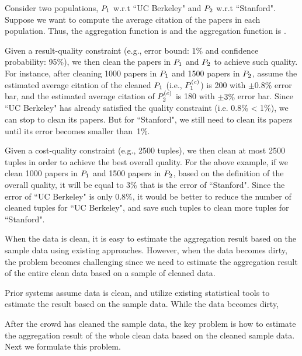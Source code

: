 \begin{example}\label{exa:problem-formulation}
Consider two populations, $P_{1}$ w.r.t ``UC Berkeley" and  $P_{2}$ w.r.t ``Stanford". Suppose we want to compute the average citation of the papers in each population. Thus, the aggregation function is  and the aggregation function is . 

Given a result-quality constraint (e.g., error bound: 1\% and confidence probability: 95\%), we then clean the papers in $P_{1}$ and $P_{2}$ to achieve such quality. For instance, after cleaning 1000 papers in $P_{1}$ and 1500 papers in $P_{2}$, assume the estimated average citation of the cleaned $P_{1}$ (i.e., $P^{(c)}_{1}$) is 200 with $\pm0.8\%$ error bar, and the estimated average citation of $P^{(c)}_{2}$ is 180 with $\pm 3\%$ error bar. Since ``UC Berkeley" has already satisfied the quality constraint (i.e. 0.8\% < 1\%), we can stop to clean its papers. But for ``Stanford", we still need to clean its papers until its error becomes smaller than~1\%. 

Given a cost-quality constraint (e.g., 2500 tuples), we then clean at most 2500 tuples in order to achieve the best overall quality. For the above example, if we clean 1000 papers in $P_{1}$ and 1500 papers in $P_{2}$, based on the definition of the overall quality, it will be equal to 3\% that is the error of ``Stanford". Since the error of ``UC Berkeley" is only 0.8\%, it would be better to reduce the number of cleaned tuples for ``UC Berkeley", and save such tuples to clean more tuples for ``Stanford". 
\end{example}

\fi
\iffalse




When the data is clean, it is easy to estimate the aggregation result based on the sample data using existing approaches. However, when the data becomes dirty, the problem becomes challenging since we need to estimate the aggregation result of the entire clean data based on a sample of cleaned data.

Prior \saqp systems assume data is clean, and utilize existing statistical tools to estimate the result based on the sample data. While the data becomes dirty, 

After the crowd has cleaned the sample data, the key problem is how to estimate the aggregation result of the whole clean data based on the cleaned sample data. Next we formulate this problem.

